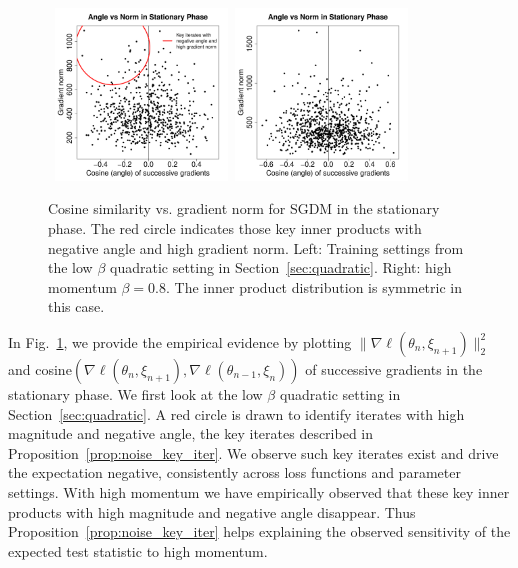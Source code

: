 \documentclass[conference]{IEEEtran}
\begin{document}
\begin{figure}[ht]
\mbox{
  \includegraphics[width=1.8in]{fig/4-2_AngleNorm.pdf}\hspace{-0.12in}
  \includegraphics[width=1.8in]{fig/RFig7_HMAN.pdf}
}
\vspace{-0.1in}
  \caption{Cosine similarity vs. gradient norm for SGDM in the stationary phase.
  The red circle indicates those key inner products with negative angle and high gradient norm.
  Left: Training settings from the low $\beta$ quadratic setting in Section~\ref{sec:quadratic}.
  Right: high momentum $\beta = 0.8$.
  The inner product distribution is symmetric in this case. 
  }
  \label{fig:angle_norm}
\end{figure}

In Fig.~\ref{fig:angle_norm}, we provide the empirical evidence by plotting $\| \nabla \ell (\theta_n, \xi_{n+1}) \|_2^2$ and  cosine$(\nabla \ell (\theta_n, \xi_{n+1}), \nabla \ell (\theta_{n-1}, \xi_{n}) )$ of successive gradients in the stationary phase. 
We first look at the low $\beta$ quadratic setting in Section~\ref{sec:quadratic}. 
A red circle is drawn to identify iterates with high magnitude and negative angle, the key iterates described in Proposition~\ref{prop:noise_key_iter}. 
We observe such key iterates exist and drive the expectation negative, consistently across loss functions and parameter settings.  
With high momentum we have empirically observed that these key inner products with high magnitude and negative angle disappear.
Thus Proposition~\ref{prop:noise_key_iter} helps explaining the observed sensitivity of the expected test statistic to high momentum.
\end{document}
